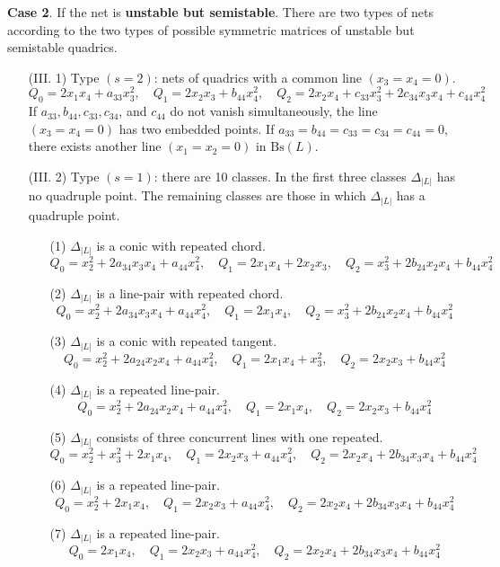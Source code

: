 \documentclass{amsart}[12pt]
\theoremstyle{definition}
\theoremstyle{remark}
\numberwithin{equation}{section}
\newcommand{\abs}[1]{\lvert#1\rvert}
\begin{document}
\textbf{Case 2}. If the net is \textbf{unstable but semistable}. There are two types of nets according to the two types of possible symmetric matrices of unstable but semistable quadrics.
\begin{itemize}
\item[(III. 1)] Type $(s = 2)$: nets of quadrics with a common line $(x_3 = x_4 = 0)$.
\[
Q_0 = 2x_1x_4 + a_{33}x_3^2, \quad Q_1 = 2x_2x_3 + b_{44}x_4^2, \quad Q_2 = 2x_2x_4 + c_{33}x_3^2 + 2c_{34}x_3x_4 + c_{44}x_4^2
\]
If $a_{33}, b_{44}, c_{33}, c_{34}$, and $c_{44}$ do not vanish simultaneously, the line $(x_3 = x_4 = 0)$ has two embedded points. If $a_{33} = b_{44} = c_{33} = c_{34} = c_{44} = 0$, there exists another line $(x_1 = x_2 = 0)$ in $\mathrm{Bs}(L)$.

\item[(III. 2)] Type $(s = 1)$: there are 10 classes. In the first three classes $\Delta_{\abs{L}}$ has no quadruple point. The remaining classes are those in which $\Delta_{\abs{L}}$ has a quadruple point.
\begin{itemize}
\item[(1)] $\Delta_{\abs{L}}$ is a conic with repeated chord.
\[
Q_0 = x_2^2 + 2a_{34}x_3x_4  + a_{44}x_4^2, \quad Q_1 = 2x_1x_4 + 2 x_2x_3, \quad Q_2 = x_3^2 + 2b_{24}x_2x_4 + b_{44}x_4^2 
\]
\item[(2)] $\Delta_{\abs{L}}$ is a line-pair with repeated chord.
\[
Q_0 = x_2^2 + 2a_{34}x_3x_4  + a_{44}x_4^2, \quad Q_1 = 2x_1x_4, \quad Q_2 = x_3^2 + 2b_{24}x_2x_4 + b_{44}x_4^2 
\]
\item[(3)] $\Delta_{\abs{L}}$ is a conic with repeated tangent. 
\[
Q_0 = x_2^2 + 2a_{24}x_2x_4 + a_{44}x_4^2, \quad Q_1 = 2x_1x_4 + x_3^2, \quad Q_2 = 2x_2x_3 + b_{44}x_4^2 
\]
\item[(4)] $\Delta_{\abs{L}}$ is a repeated line-pair.
\[
Q_0 = x_2^2 + 2a_{24}x_2x_4 + a_{44}x_4^2, \quad Q_1 = 2x_1x_4, \quad Q_2 = 2x_2x_3 + b_{44}x_4^2 
\]
\item[(5)] $\Delta_{\abs{L}}$ consists of three concurrent lines with one repeated.
\[
Q_0 = x_2^2 + x_3^2 + 2x_1x_4, \quad Q_1 = 2x_2x_3 + a_{44}x_4^2,  \quad Q_2 = 2x_2x_4 + 2b_{34}x_3x_4 + b_{44}x_4^2 
\]
\item[(6)] $\Delta_{\abs{L}}$ is a repeated line-pair.
\[
Q_0 = x_2^2 + 2x_1x_4, \quad Q_1 = 2x_2x_3 + a_{44}x_4^2,  \quad Q_2 = 2x_2x_4 + 2b_{34}x_3x_4 + b_{44}x_4^2 
\]
\item[(7)] $\Delta_{\abs{L}}$ is a repeated line-pair.
\[
Q_0 = 2x_1x_4, \quad Q_1 = 2x_2x_3 + a_{44}x_4^2,  \quad Q_2 = 2x_2x_4 + 2b_{34}x_3x_4 + b_{44}x_4^2 
\]
\end{itemize}
\end{itemize}
\end{document}
